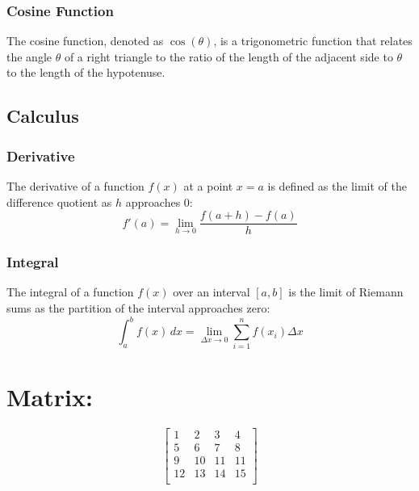 \documentclass{article}
\begin{document}
\subsubsection{Cosine Function}
The cosine function, denoted as \(\cos(\theta)\), is a trigonometric function that relates the angle \(\theta\) of a right triangle to the ratio of the length of the adjacent side to \(\theta\) to the length of the hypotenuse.

\subsection{Calculus}

\subsubsection{Derivative}
The derivative of a function \(f(x)\) at a point \(x=a\) is defined as the limit of the difference quotient as \(h\) approaches 0:
\[ f'(a) = \lim_{{h \to 0}} \frac{f(a + h) - f(a)}{h} \]

\subsubsection{Integral}
The integral of a function \(f(x)\) over an interval \([a, b]\) is the limit of Riemann sums as the partition of the interval approaches zero:
\[ \int_{a}^{b} f(x) \,dx = \lim_{{\Delta x \to 0}} \sum_{{i=1}}^{n} f(x_i) \Delta x \]

\newpage
\section{Matrix:}
\begin{equation}
    \begin{bmatrix}
    1 & 2 & 3 & 4 \\
    5 & 6 & 7 & 8 \\
    9 & 10 & 11 & 11 \\
    12 & 13 & 14 & 15 \\
    \end{bmatrix}
\end{equation}\\
\end{document}
